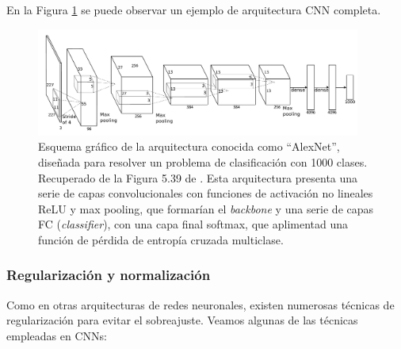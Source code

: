 En la Figura \ref{fig:CNN_complete} se puede observar un ejemplo de arquitectura CNN completa. 


\begin{figure}[h]
    \centering
    \includegraphics[width=0.95\textwidth]{capitulos/cap_02/imagenes/CNN_complete.png}
    \caption[
        Esquema gráfico de la arquitectura conocida como ``AlexNet'', diseñada para resolver un problema
        de clasificación con 1000 clases.
        Recuperado de la Figura 5.39 de \cite{szeliski2010}.
    ]{
        Esquema gráfico de la arquitectura conocida como ``AlexNet'', diseñada para resolver un problema
        de clasificación con 1000 clases.
        Recuperado de la Figura 5.39 de \cite{szeliski2010}.
        Esta arquitectura presenta una serie de capas convolucionales con funciones de activación no lineales 
        ReLU y max pooling, que formarían el \textit{backbone} y una serie de capas FC (\textit{classifier}), 
        con una capa final softmax, que aplimentad una función de pérdida de entropía cruzada multiclase.
    } 
    \label{fig:CNN_complete}
\end{figure}


\subsubsection{Regularización y normalización}

Como en otras arquitecturas de redes neuronales, existen numerosas técnicas de regularización para evitar
el sobreajuste. Veamos algunas de las técnicas empleadas en CNNs:

